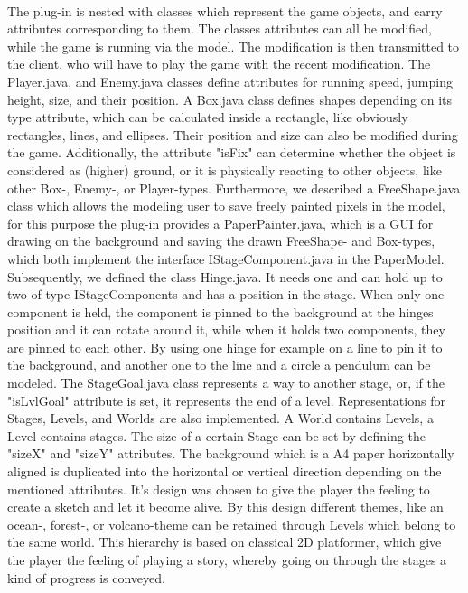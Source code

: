 \\The plug-in is nested with classes which represent the game objects, and carry attributes corresponding to them. The classes attributes can all be modified, while the game is running via the model. The modification is then transmitted to the client, who will have to play the game with the recent modification. The Player.java, and Enemy.java classes define attributes for running speed, jumping height, size, and their position. A Box.java class defines shapes depending on its type attribute, which can be calculated inside a rectangle, like obviously rectangles, lines, and ellipses. Their position and size can also be modified during the game. Additionally, the attribute "isFix" can determine whether the object is considered as (higher) ground, or it is physically reacting to other objects, like other Box-, Enemy-, or Player-types. Furthermore, we described a FreeShape.java class which allows the modeling user to save freely painted pixels in the model, for this purpose the plug-in provides a PaperPainter.java, which is a GUI for drawing on the background and saving the drawn FreeShape- and Box-types, which both implement the interface IStageComponent.java in the PaperModel. Subsequently, we defined the class Hinge.java. It needs one and can hold up to two of type IStageComponents and has a position in the stage. When only one component is held, the component is pinned to the background at the hinges position and it can rotate around it, while when it holds two components, they are pinned to each other. By using one hinge for example on a line to pin it to the background, and another one to the line and a circle a pendulum can be modeled. The StageGoal.java class represents a way to another stage, or, if the "isLvlGoal" attribute is set, it represents the end of a level.
Representations for Stages, Levels, and Worlds are also implemented. A World contains Levels, a Level contains stages. The size of a certain Stage can be set by defining the "sizeX" and "sizeY" attributes. The background which is a A4 paper horizontally aligned is duplicated into the horizontal or vertical direction depending on the mentioned attributes. It's design was chosen to give the player the feeling to create a sketch and let it become alive. By this design different themes, like an ocean-, forest-, or volcano-theme can be retained through Levels which belong to the same world. This hierarchy is based on classical 2D platformer, which give the player the feeling of playing a story, whereby going on through the stages a kind of progress is conveyed.
